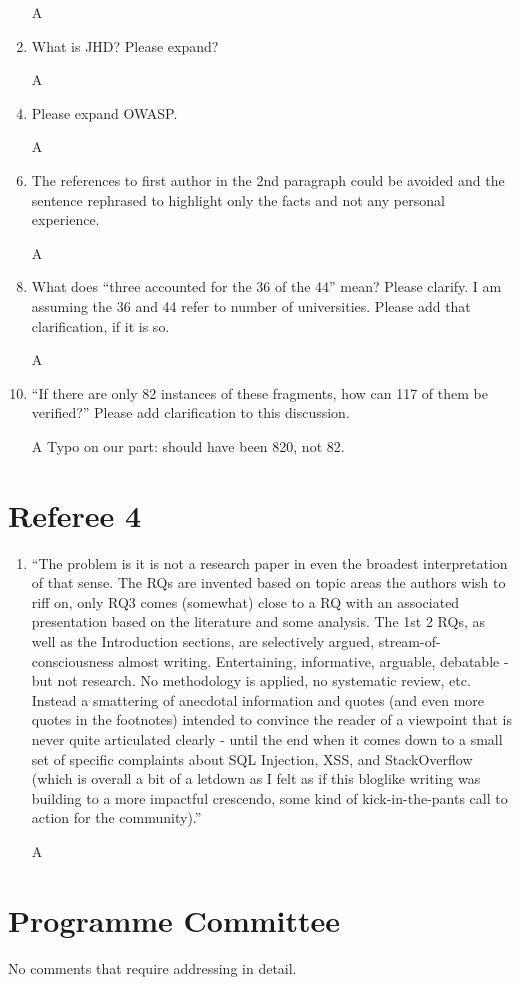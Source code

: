 \documentclass{article}
\begin{document}
\begin{enumerate}
\item[A]
\item  What is JHD? Please expand?
\item[A]
\item Please expand OWASP. 
\item[A]
\item 
The references to first author in the 2nd paragraph could be avoided and the sentence rephrased to highlight only the facts and not any personal experience. 
\item[A]
\item 
 What does ``three accounted for the 36 of the 44'' mean? Please clarify. I am assuming the 36 and 44 refer to number of universities. Please add that clarification, if it is so.
\item[A]
\item 
``If there are only 82 instances of these fragments, how can 117 of them be verified?'' Please add clarification to this discussion.
\item[A]Typo on our part: should have been 820, not 82.
\end{enumerate}
\section{Referee 4}
\begin{enumerate}
\item ``The problem is it is not a research paper in even the broadest interpretation of that sense. The RQs are invented based on topic areas the authors wish to riff on, only RQ3 comes (somewhat) close to a RQ with an associated presentation based on the literature and some analysis. The 1st 2 RQs, as well as the Introduction sections, are selectively argued, stream-of-consciousness almost writing. Entertaining, informative, arguable, debatable - but not research. No methodology is applied, no systematic review, etc. Instead a smattering of anecdotal information and quotes (and even more quotes in the footnotes) intended to convince the reader of a viewpoint that is never quite articulated clearly - until the end when it comes down to a small set of specific complaints about SQL Injection, XSS, and StackOverflow (which is overall a bit of a letdown as I felt as if this bloglike writing was building to a more impactful crescendo, some kind of kick-in-the-pants call to action for the community).''
\item[A]
\end{enumerate}
\section{Programme Committee}
No comments that require addressing in detail.
\end{document}
